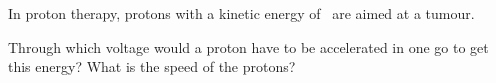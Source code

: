 In proton therapy, protons with a kinetic energy of \EkO\ are aimed at a tumour.

\begin{abcliste}
\abc Through which voltage would a proton have to be accelerated in one go to get this energy?
\abc What is the speed of the protons?
\end{abcliste}

